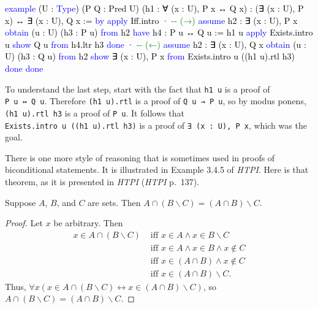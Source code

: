 \documentclass[
  letterpaper,
  DIV=11,
  numbers=noendperiod]{scrreprt}
\newenvironment{Shaded}{\begin{snugshade}}{\end{snugshade}}
\newcommand{\CommentTok}[1]{\textcolor[rgb]{0.37,0.37,0.37}{#1}}
\newcommand{\KeywordTok}[1]{\textcolor[rgb]{0.00,0.23,0.31}{#1}}
\newcommand{\NormalTok}[1]{\textcolor[rgb]{0.00,0.23,0.31}{#1}}
\renewcommand{\NormalTok}[1]{\textcolor[HTML]{000000}{#1}}
\renewcommand{\KeywordTok}[1]{\textcolor[HTML]{0000FF}{#1}}
\renewcommand{\CommentTok}[1]{\textcolor[HTML]{008000}{#1}}
\newcommand{\excl}[1]{}
\newcommand{\setmin}{\mathbin{\backslash}}
\theoremstyle{remark}
\begin{document}
\begin{Shaded}
\begin{Highlighting}[]
\KeywordTok{example}\NormalTok{ (U : }\KeywordTok{Type}\NormalTok{) (P Q : Pred U)}
\NormalTok{    (h1 : ∀ (x : U), P x ↔ Q x) :}
\NormalTok{    (∃ (x : U), P x) ↔ ∃ (x : U), Q x := }\KeywordTok{by}
  \KeywordTok{apply}\NormalTok{ Iff.intro}
\NormalTok{  · }\CommentTok{{-}{-} (→)}
    \KeywordTok{assume}\NormalTok{ h2 : ∃ (x : U), P x}
    \KeywordTok{obtain}\NormalTok{ (u : U) (h3 : P u) }\KeywordTok{from}\NormalTok{ h2}
    \KeywordTok{have}\NormalTok{ h4 : P u ↔ Q u := h1 u}
    \KeywordTok{apply}\NormalTok{ Exists.intro u}
    \KeywordTok{show}\NormalTok{ Q u }\KeywordTok{from}\NormalTok{ h4.ltr h3}
    \KeywordTok{done}
\NormalTok{  · }\CommentTok{{-}{-} (←)}
    \KeywordTok{assume}\NormalTok{ h2 : ∃ (x : U), Q x}
    \KeywordTok{obtain}\NormalTok{ (u : U) (h3 : Q u) }\KeywordTok{from}\NormalTok{ h2}
    \KeywordTok{show}\NormalTok{ ∃ (x : U), P x }\KeywordTok{from}\NormalTok{ Exists.intro u ((h1 u).rtl h3)}
    \KeywordTok{done}
  \KeywordTok{done}
\end{Highlighting}
\end{Shaded}

To understand the last step, start with the fact that \texttt{h1\ u} is
a proof of \texttt{P\ u\ ↔\ Q\ u}. Therefore \texttt{(h1\ u).rtl} is a
proof of \texttt{Q\ u\ →\ P\ u}, so by modus ponens,
\texttt{(h1\ u).rtl\ h3} is a proof of \texttt{P\ u}. It follows that
\texttt{Exists.intro\ u\ ((h1\ u).rtl\ h3)} is a proof of
\texttt{∃\ (x\ :\ U),\ P\ x}, which was the goal.

There is one more style of reasoning that is sometimes used in proofs of
biconditional statements. It is illustrated in Example 3.4.5 of
\emph{HTPI}. Here is that theorem, as it is presented in \emph{HTPI}
(\emph{HTPI} p.~137).

\begin{thm}
Suppose \(A\), \(B\), and \(C\) are sets. Then
\(A \cap (B \setmin C) = (A \cap B) \setmin C\).

\end{thm}

\begin{proof}

Let \(x\) be arbitrary. Then \begin{align*}
x \in A \cap (B \setmin C) &\text{ iff } x \in A \wedge x \in B \setmin C\\
&\text{ iff } x \in A \wedge x \in B \wedge x \notin C\\
&\text{ iff } x \in (A \cap B) \wedge x \notin C\\
&\text{ iff } x \in (A \cap B) \setmin C.
\end{align*} Thus,
\(\forall x(x \in A \cap (B \setmin C) \leftrightarrow x \in (A \cap B) \setmin C)\),
so \(A \cap (B \setmin C) = (A \cap B) \setmin C\). \excl{~□}\qedhere

\end{proof}
\end{document}
